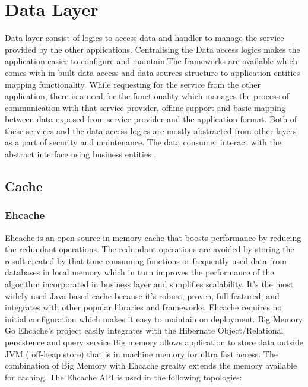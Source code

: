 \chapter{Data Layer}\label{ch:ch5label}

		
		Data layer consist of logics to access data and handler to manage the service provided by the other  applications. Centralising the Data access logics makes the application easier to configure and maintain.The frameworks are available which comes with in built data access and data sources structure to application entities mapping functionality. While requesting for the service from the other application, there is a need for the functionality which manages the process of communication with that service provider, offline support and basic mapping between data exposed from service provider and the application format. Both of these services and the data access logics are mostly abstracted from other layers as a part of security and maintenance. The data consumer interact with the abstract interface using business entities .

\section{Cache} 

\subsection{Ehcache}
			
			Ehcache is an open source in-memory cache that boosts performance by reducing the redundant operations. The redundant operations are avoided by storing the result created by that time consuming functions or frequently used data from databases in local memory which in turn improves the performance of the algorithm incorporated in business layer and simplifies scalability. It's the most widely-used Java-based cache because it's robust, proven, full-featured, and integrates with other popular libraries and frameworks. Ehcache requires no initial configuration which makes it easy to maintain on deployment.  Big Memory Go Ehcache’s project easily integrates with the Hibernate Object/Relational persistence and query service.Big memory allows application to store data outside JVM ( off-heap store) that is in machine memory for ultra fast access. The combination of Big Memory with Ehcache grealty extends the memory available for caching. The Ehcache API is used in the following topologies:
			
